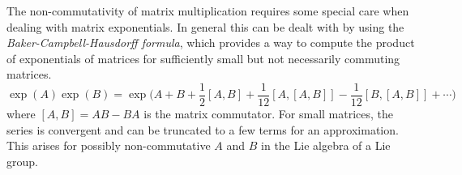 \vspace*{2em}
The non-commutativity of matrix multiplication requires some special care when dealing with matrix exponentials.
In general this can be dealt with by using the \textit{Baker-Campbell-Hausdorff formula}, which provides a way to compute the product of exponentials of matrices for sufficiently small but not necessarily commuting matrices.
\begin{equation*}
    \exp(A) \exp(B)
    =
    \exp\Big(A+B+\frac{1}{2}[A,B]+\frac{1}{12}[A,[A,B]]-\frac{1}{12}[B,[A,B]]+\cdots\Big)
\end{equation*}
where \( [A,B] = AB - BA \) is the matrix commutator.
For small matrices, the series is convergent and can be truncated to a few terms for an approximation.
This arises for possibly non-commutative \( A \) and \( B \) in the Lie algebra of a Lie group.
